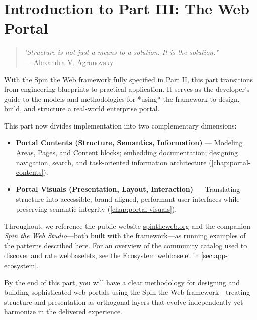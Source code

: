 
\chapter*{Introduction to Part III: The Web Portal}
\label{part:implementation}

\begin{quote}
\textit{"Structure is not just a means to a solution. It is the solution."} \\
— Alexandra V. Agranovsky
\end{quote}

With the Spin the Web framework fully specified in Part II, this part transitions from engineering blueprints to practical application. It serves as the developer's guide to the models and methodologies for *using* the framework to design, build, and structure a real-world enterprise portal.

This part now divides implementation into two complementary dimensions:
\begin{itemize}
	\item \textbf{Portal Contents (Structure, Semantics, Information)} — Modeling Areas, Pages, and Content blocks; embedding documentation; designing navigation, search, and task-oriented information architecture (\cref{chap:portal-contents}).
	\item \textbf{Portal Visuals (Presentation, Layout, Interaction)} — Translating structure into accessible, brand-aligned, performant user interfaces while preserving semantic integrity (\cref{chap:portal-visuals}).
\end{itemize}

Throughout, we reference the public website \href{https://spintheweb.org}{spintheweb.org} and the companion \textit{Spin the Web Studio}—both built with the framework—as running examples of the patterns described here. For an overview of the community catalog used to discover and rate webbaselets, see the Ecosystem webbaselet in \cref{sec:app-ecosystem}.

By the end of this part, you will have a clear methodology for designing and building sophisticated web portals using the Spin the Web framework—treating structure and presentation as orthogonal layers that evolve independently yet harmonize in the delivered experience.
